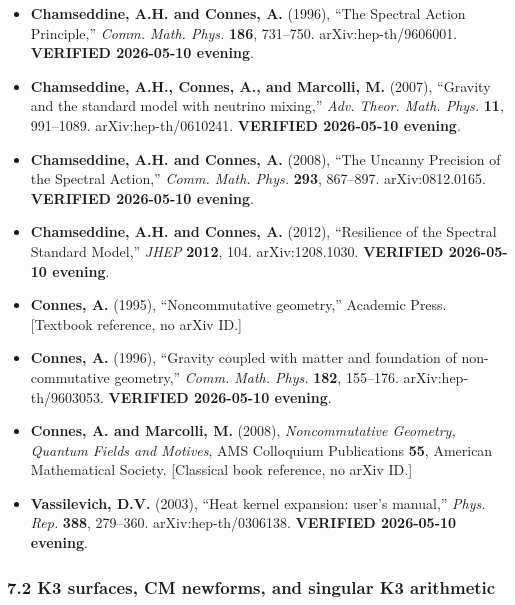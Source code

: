 \documentclass[
  11pt,
  a4paper,
]{article}
\begin{document}
\begin{itemize}
\item
  \textbf{Chamseddine, A.H. and Connes, A.} (1996), ``The Spectral Action Principle,'' \emph{Comm. Math. Phys.} \textbf{186}, 731--750. arXiv:hep-th/9606001. \textbf{VERIFIED 2026-05-10 evening}.
\item
  \textbf{Chamseddine, A.H., Connes, A., and Marcolli, M.} (2007), ``Gravity and the standard model with neutrino mixing,'' \emph{Adv. Theor. Math. Phys.} \textbf{11}, 991--1089. arXiv:hep-th/0610241. \textbf{VERIFIED 2026-05-10 evening}.
\item
  \textbf{Chamseddine, A.H. and Connes, A.} (2008), ``The Uncanny Precision of the Spectral Action,'' \emph{Comm. Math. Phys.} \textbf{293}, 867--897. arXiv:0812.0165. \textbf{VERIFIED 2026-05-10 evening}.
\item
  \textbf{Chamseddine, A.H. and Connes, A.} (2012), ``Resilience of the Spectral Standard Model,'' \emph{JHEP} \textbf{2012}, 104. arXiv:1208.1030. \textbf{VERIFIED 2026-05-10 evening}.
\item
  \textbf{Connes, A.} (1995), ``Noncommutative geometry,'' Academic Press. {[}Textbook reference, no arXiv ID.{]}
\item
  \textbf{Connes, A.} (1996), ``Gravity coupled with matter and foundation of non-commutative geometry,'' \emph{Comm. Math. Phys.} \textbf{182}, 155--176. arXiv:hep-th/9603053. \textbf{VERIFIED 2026-05-10 evening}.
\item
  \textbf{Connes, A. and Marcolli, M.} (2008), \emph{Noncommutative Geometry, Quantum Fields and Motives}, AMS Colloquium Publications \textbf{55}, American Mathematical Society. {[}Classical book reference, no arXiv ID.{]}
\item
  \textbf{Vassilevich, D.V.} (2003), ``Heat kernel expansion: user's manual,'' \emph{Phys. Rep.} \textbf{388}, 279--360. arXiv:hep-th/0306138. \textbf{VERIFIED 2026-05-10 evening}.
\end{itemize}

\hypertarget{k3-surfaces-cm-newforms-and-singular-k3-arithmetic}{%
\subsubsection{7.2 K3 surfaces, CM newforms, and singular K3 arithmetic}\label{k3-surfaces-cm-newforms-and-singular-k3-arithmetic}}
\end{document}
